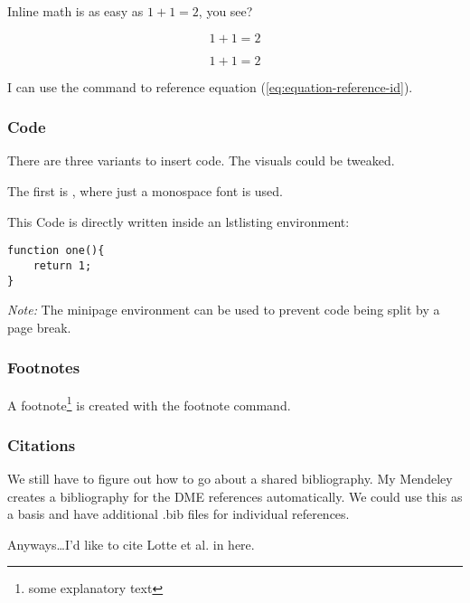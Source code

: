Inline math is as easy as $1 + 1 = 2$, you see?

\[
    1 + 1 = 2
\]

\begin{equation}
    1 + 1 = 2
    \label{eq:equation-reference-id}
\end{equation}

I can use the  command to reference equation (\ref{eq:equation-reference-id}).


\subsubsection{Code}
There are three variants to insert code. The visuals could be tweaked.

The first is , where just a monospace font is used.

This Code is directly written inside an lstlisting environment:
\begin{lstlisting}
function one(){
    return 1;
}
\end{lstlisting}

\begin{minipage}{\textwidth}{
\emph{Note:} The minipage environment can be used to prevent code being split by a page break.
}
\end{minipage}


\subsubsection{Footnotes}

A footnote\footnote{some explanatory text} is created with the footnote command.


\subsubsection{Citations}
We still have to figure out how to go about a shared bibliography.
My Mendeley creates a bibliography for the DME references automatically.
We could use this as a basis and have additional .bib files for individual references.

Anyways\ldots I'd like to cite Lotte et al.\cite{Lotte2007} in here.

